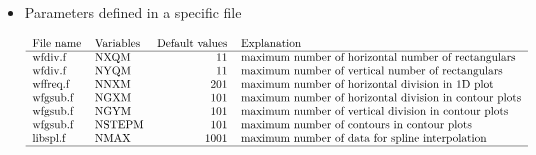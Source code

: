 \begin{itemize}
\item
Parameters defined in a specific file

\[
\begin{tabular}{llrl}
File name & Variables & Default values & Explanation \\
\hline
wfdiv.f  & NXQM & 11 & maximum number of horizontal number of rectangulars \\
wfdiv.f  & NYQM & 11 & maximum number of vertical number of rectangulars \\
wffreq.f & NNXM & 201 & maximum number of horizontal division in
1D plot \\
wfgsub.f & NGXM & 101 & maximum number of horizontal division in
contour plots \\
wfgsub.f & NGYM & 101 & maximum number of vertical division in contour
plots \\
wfgsub.f & NSTEPM & 101 & maximum number of contours in contour plots \\
libspl.f & NMAX & 1001 & maximum number of data for spline interpolation \\
\hline
\end{tabular}
\]
\end{itemize}

